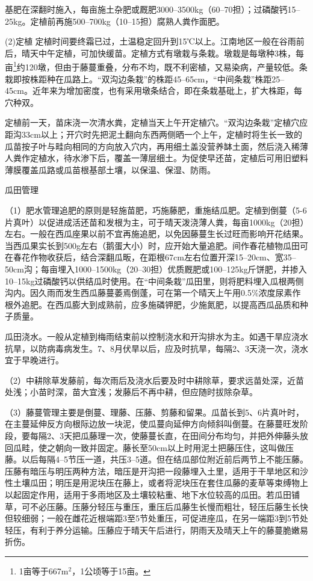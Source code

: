 \documentclass{ctexbook}
\begin{document}
基肥在深翻时施入，每亩施土杂肥或厩肥3000--3500kg（60--70担）；过磷酸钙15--25kg。定植前再施500--700kg（10--15担）腐熟人粪作面肥。

(2)定植 定植时间要终霜已过，土温稳定回升到15℃以上。江南地区一般在谷雨前后，晴天中午定植，可加快缓苗。定植方式有墩栽与条栽。墩栽是每墩种3株，每亩\footnote{1亩等于667m$^2$，1公顷等于15亩。}约120墩，但由于藤蔓重叠，分布不均，既不利密植，又易染病，产量较低。条栽即按株距种在瓜路上。“双沟边条栽”的株距45--65cm，“中间条栽”株距25--45cm。近年来为增加密度，也有采用墩条结合，即在条栽基砒上，扩大株距，每穴种双。

定植前一天，苗床浇一次清水粪，定植当天上午开定植穴。“双沟边条栽”定植穴应距沟33cm以上；开穴时先把泥土翻向东西两侧晒一个上午，定植时将生长一致的瓜苗按子叶与畦向相同的方向放入穴内，再用细土盖没营养缽土面，然后浇入稀薄人粪作定植水，待水渗下后，覆盖一薄层细土。为促使早还苗，定植后可用旧塑料薄膜覆盖瓜路或瓜苗根基部土壤，以保温、保湿、防雨。

瓜田管理

（1）肥水管理追肥的原则是轻施苗肥，巧施藤肥，重施结瓜肥。定植到倒蔓（5-6片真叶）以促进成活还苗和发根为主，可于晴天泼浇薄人粪，每亩1000kg（20担）左右。一般在西瓜座果以前不宜再施追肥，以免因藤蔓生长过旺而影响开花结果。当西瓜果实长到500g左右（鹅蛋大小）时，应开始大量追肥。间作春花植物瓜田可在春花作物收获后，结合深翻瓜畈，在距根67cm左右位置开深15--20cm、宽35--50cm沟；每亩埋入1000--1500kg（20--30担）优质厩肥或100--125kg斤饼肥，并掺入10--15kg过磷酸钙以供结瓜时使用。在“中间条栽”瓜田里，则将肥料埋入瓜根两侧沟内。因久雨而发生西瓜藤蔓萎焉倒蓬，可在第一个晴天上午用0.5\%浓度尿素作根外追肥。在西瓜膨大到成熟前，应多施磷钾肥，少施氮肥，以提高西瓜品质和种子质量。

瓜田浇水。一般从定植到梅雨结束前以控制浇水和开沟排水为主。如遇干旱应浇水抗旱，以防病毒病发生。7、8月伏旱以后，应及时抗旱，每隔2、3天浇一次，浇水宜于早晚进行。

（2）中耕除草发藤前，每次雨后及浇水后要及时中耕除草，要求远苗处深，近苗处浅；小苗时深，苗大宜浅；发藤后不再中耕，但应随时拔除杂草。

（3）藤蔓管理主要是倒蔓、理藤、压藤、剪藤和留果。瓜苗长到5、6片真叶时，在主蔓延伸反方向根际边放一块泥，使瓜蔓向延伸方向倾斜叫倒蔓。在藤蔓旺发阶段，要每隔2、3天把瓜藤理一次，使藤蔓长直，在田间分布均匀，并把外伸藤头放回瓜畦，使之朝向一致并固定。藤长至50cm以上时用泥土把藤压住，这叫做压藤。以后每隔4--5节压一道，共压3--5道。但在结瓜部位附近前后两节上不能压藤。压藤有暗压与明压两种方法，暗压是开沟把一段藤埋入土里，适用于干旱地区和沙性土壤瓜田；明压是用泥块压在藤上，或者将泥块压在套住瓜藤的麦草等束缚物上以起固定作用，适用于多雨地区及土壤较粘重、地下水位较高的瓜田。若瓜田铺草，可不必压藤。压藤分轻压与重压，重压后瓜藤生长慢而粗壮，轻压后藤生长快但较细弱；一般在雌花近根端距3至5节处重压，可促进座瓜，在另一端距3到5节处轻压，有利于养分运输。压藤应于晴天午后进行，阴雨天及晴天上午的藤蔓脆嫩易折伤。
\end{document}
